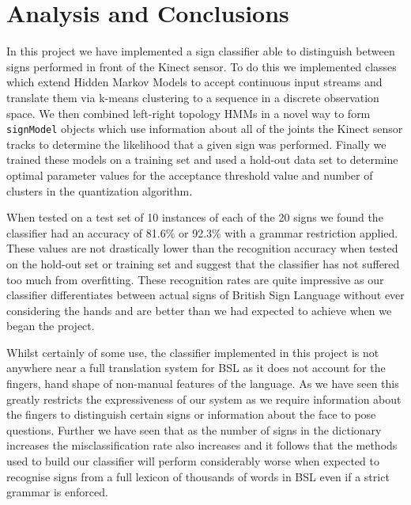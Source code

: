\def\baselinestretch{1}
\chapter{Analysis and Conclusions}
\ifpdf
    \graphicspath{{Conclusions/ConclusionsFigs/PNG/}{Conclusions/ConclusionsFigs/PDF/}{Conclusions/ConclusionsFigs/}}
\else
    \graphicspath{{Conclusions/ConclusionsFigs/EPS/}{Conclusions/ConclusionsFigs/}}
\fi

\def\baselinestretch{1.66}

In this project we have implemented a sign classifier able to distinguish between signs performed in front of the Kinect sensor. To do this we implemented classes which extend Hidden Markov Models to accept continuous input streams and translate them via k-means clustering to a sequence in a discrete observation space. We then combined left-right topology HMMs in a novel way to form \verb|signModel| objects which use information about all of the joints the Kinect sensor tracks to determine the likelihood that a given sign was performed. Finally we trained these models on a training set and used a hold-out data set to determine optimal parameter values for the acceptance threshold value and number of clusters in the quantization algorithm.

When tested on a test set of 10 instances of each of the 20 signs we found the classifier had an accuracy of 81.6\% or 92.3\% with a grammar restriction applied. These values are not drastically lower than the recognition accuracy when tested on the hold-out set or training set and suggest that the classifier has not suffered too much from overfitting. These recognition rates are quite impressive as our classifier differentiates between actual signs of British Sign Language without ever considering the hands and are better than we had expected to achieve when we began the project.

Whilst certainly of some use, the classifier implemented in this project is not anywhere near a full translation system for BSL as it does not account for the fingers, hand shape of non-manual features of the language. As we have seen this greatly restricts the expressiveness of our system as we require information about the fingers to distinguish certain signs or information about the face to pose questions. Further we have seen that as the number of signs in the dictionary increases the misclassification rate also increases and it follows that the methods used to build our classifier will perform considerably worse when expected to recognise signs from a full lexicon of thousands of words in BSL even if a strict grammar is enforced.

